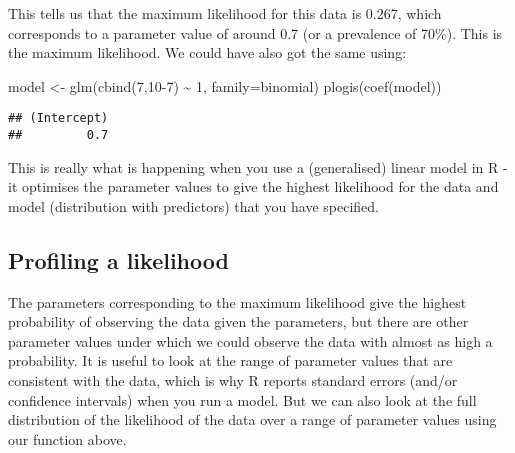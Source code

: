\documentclass[
  12pt,
]{article}
\newenvironment{Shaded}{\begin{snugshade}}{\end{snugshade}}
\newcommand{\AttributeTok}[1]{\textcolor[rgb]{0.77,0.63,0.00}{#1}}
\newcommand{\DecValTok}[1]{\textcolor[rgb]{0.00,0.00,0.81}{#1}}
\newcommand{\FunctionTok}[1]{\textcolor[rgb]{0.00,0.00,0.00}{#1}}
\newcommand{\NormalTok}[1]{#1}
\newcommand{\OtherTok}[1]{\textcolor[rgb]{0.56,0.35,0.01}{#1}}
\newcommand{\SpecialCharTok}[1]{\textcolor[rgb]{0.00,0.00,0.00}{#1}}
\begin{document}
This tells us that the maximum likelihood for this data is 0.267, which
corresponds to a parameter value of around 0.7 (or a prevalence of
70\%). This is the maximum likelihood. We could have also got the same
using:

\begin{Shaded}
\begin{Highlighting}[]
\NormalTok{model }\OtherTok{\textless{}{-}} \FunctionTok{glm}\NormalTok{(}\FunctionTok{cbind}\NormalTok{(}\DecValTok{7}\NormalTok{,}\DecValTok{10{-}7}\NormalTok{) }\SpecialCharTok{\textasciitilde{}}  \DecValTok{1}\NormalTok{, }\AttributeTok{family=}\NormalTok{binomial)}
\FunctionTok{plogis}\NormalTok{(}\FunctionTok{coef}\NormalTok{(model))}
\end{Highlighting}
\end{Shaded}

\begin{verbatim}
## (Intercept) 
##         0.7
\end{verbatim}

This is really what is happening when you use a (generalised) linear
model in R - it optimises the parameter values to give the highest
likelihood for the data and model (distribution with predictors) that
you have specified.

\hypertarget{profiling-a-likelihood}{%
\subsection{Profiling a likelihood}\label{profiling-a-likelihood}}

The parameters corresponding to the maximum likelihood give the highest
probability of observing the data given the parameters, but there are
other parameter values under which we could observe the data with almost
as high a probability. It is useful to look at the range of parameter
values that are consistent with the data, which is why R reports
standard errors (and/or confidence intervals) when you run a model. But
we can also look at the full distribution of the likelihood of the data
over a range of parameter values using our function above.
\end{document}
